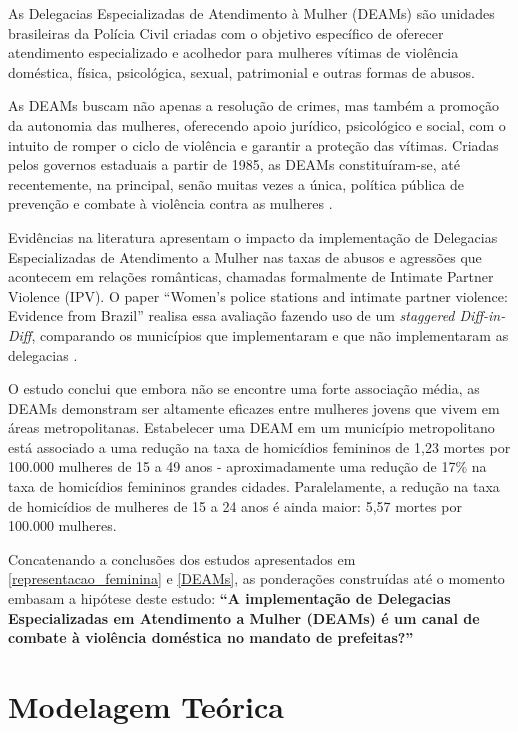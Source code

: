 As Delegacias Especializadas de Atendimento à Mulher (DEAMs) são unidades brasileiras da Polícia Civil criadas com o objetivo específico de oferecer atendimento especializado e acolhedor para mulheres vítimas de violência doméstica, física, psicológica, sexual, patrimonial e outras formas de abusos. 

As DEAMs buscam não apenas a resolução de crimes, mas também a promoção da autonomia das mulheres, oferecendo apoio jurídico, psicológico e social, com o intuito de romper o ciclo de violência e garantir a proteção das vítimas. Criadas pelos governos estaduais a partir de 1985, as DEAMs constituíram-se, até recentemente, na principal, senão muitas vezes a única, política pública de prevenção e combate à violência contra as mulheres \cite{silva2012deams}. 

Evidências na literatura apresentam o impacto da implementação de Delegacias Especializadas de Atendimento a Mulher nas taxas de abusos e agressões que acontecem em relações românticas, chamadas formalmente de Intimate Partner Violence (IPV). O paper ``Women's police stations and intimate partner violence: Evidence from Brazil” realisa essa avaliação fazendo uso de um \textit{staggered Diff-in-Diff}, comparando os municípios que implementaram e que não implementaram as delegacias \cite{perova2017women}. 

O estudo conclui que embora não se encontre uma forte associação média, as DEAMs demonstram ser altamente eficazes entre mulheres jovens que vivem em áreas metropolitanas. Estabelecer uma DEAM em um município metropolitano está associado a uma redução na taxa de homicídios femininos de 1,23 mortes por 100.000 mulheres de 15 a 49 anos - aproximadamente uma redução de 17\% na taxa de homicídios femininos grandes cidades. Paralelamente, a redução na taxa de homicídios de mulheres de 15 a 24 anos é ainda maior: 5,57 mortes por 100.000 mulheres. 

Concatenando a conclusões dos estudos apresentados em \ref{representacao_feminina} e \ref{DEAMs}, as ponderações construídas até o momento embasam a hipótese deste estudo: \textbf{``A implementação de Delegacias Especializadas em Atendimento a Mulher (DEAMs) é um canal de combate à violência doméstica no mandato de prefeitas?”}

\section{Modelagem Teórica}
\label{Modelagem_teorica}


